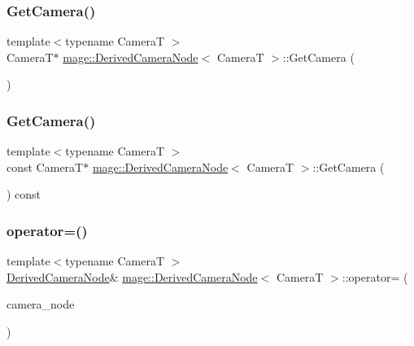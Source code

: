 \subsubsection{\texorpdfstring{Get\+Camera()}{GetCamera()}\hspace{0.1cm}{\footnotesize\ttfamily [1/2]}}
{\footnotesize\ttfamily template$<$typename CameraT $>$ \\
CameraT$\ast$ \hyperlink{classmage_1_1_derived_camera_node}{mage\+::\+Derived\+Camera\+Node}$<$ CameraT $>$\+::Get\+Camera (\begin{DoxyParamCaption}{ }\end{DoxyParamCaption})}

\hypertarget{classmage_1_1_derived_camera_node_a645e4b4775ae62190cdbdbdfabf9616f}{}\label{classmage_1_1_derived_camera_node_a645e4b4775ae62190cdbdbdfabf9616f} 
\subsubsection{\texorpdfstring{Get\+Camera()}{GetCamera()}\hspace{0.1cm}{\footnotesize\ttfamily [2/2]}}
{\footnotesize\ttfamily template$<$typename CameraT $>$ \\
const CameraT$\ast$ \hyperlink{classmage_1_1_derived_camera_node}{mage\+::\+Derived\+Camera\+Node}$<$ CameraT $>$\+::Get\+Camera (\begin{DoxyParamCaption}{ }\end{DoxyParamCaption}) const}

\hypertarget{classmage_1_1_derived_camera_node_a827c7952e061c6e12e38fff12585b3b3}{}\label{classmage_1_1_derived_camera_node_a827c7952e061c6e12e38fff12585b3b3} 
\subsubsection{\texorpdfstring{operator=()}{operator=()}\hspace{0.1cm}{\footnotesize\ttfamily [1/2]}}
{\footnotesize\ttfamily template$<$typename CameraT $>$ \\
\hyperlink{classmage_1_1_derived_camera_node}{Derived\+Camera\+Node}\& \hyperlink{classmage_1_1_derived_camera_node}{mage\+::\+Derived\+Camera\+Node}$<$ CameraT $>$\+::operator= (\begin{DoxyParamCaption}\item[{const \hyperlink{classmage_1_1_derived_camera_node}{Derived\+Camera\+Node}$<$ CameraT $>$ \&}]{camera\+\_\+node }\end{DoxyParamCaption})\hspace{0.3cm}{\ttfamily [delete]}}

